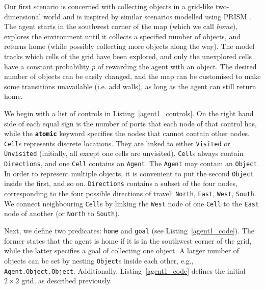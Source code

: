 \documentclass[runningheads]{llncs}
\begin{document}
Our first scenario is concerned with collecting objects in a grid-like
two-dimensional world and is inspired by similar scenarios modelled using PRISM
\cite{dblp:conf/nfm/giaquintahimn18,DBLP:conf/spin/HoffmannIMNV16}. The agent
starts in the southwest corner of the map (which we call \emph{home}), explores
the environment until it collects a specified number of objects, and returns
home (while possibly collecting more objects along the way). The model tracks
which cells of the grid have been explored, and only the unexplored cells have a
constant probability $p$ of rewarding the agent with an object. The desired
number of objects can be easily changed, and the map can be customised to make
some transitions unavailable (i.e. add walls), as long as the agent can still
return home.



We begin with a list of controls in Listing~\ref{agent1_controls}. On the right
hand side of each equal sign is the number of ports that each node of that
control has, while the \texttt{\textbf{atomic}} keyword specifies the nodes that
cannot contain other nodes. \texttt{Cell}s represents discrete locations. They
are linked to either \texttt{Visited} or \texttt{Unvisited} (initially, all
except one cells are unvisited). \texttt{Cell}s always contain
\texttt{Directions}, and one \texttt{Cell} contains an \texttt{Agent}. The
\texttt{Agent} may contain an \texttt{Object}. In order to represent multiple
objects, it is convenient to put the second \texttt{Object} inside the first,
and so on. \texttt{Directions} contains a subset of the four nodes,
corresponding to the four possible directions of travel: \texttt{North},
\texttt{East}, \texttt{West}, \texttt{South}. We connect neighbouring
\texttt{Cell}s by linking the \texttt{West} node of one \texttt{Cell} to the
\texttt{East} node of another (or \texttt{North} to \texttt{South}).



Next, we define two predicates: \texttt{home} and \texttt{goal} (see
Listing~\ref{agent1_code}). The former states that the agent is home if it is in
the southwest corner of the grid, while the latter specifies a goal of
collecting one object. A larger number of objects can be set by nesting
\texttt{Object}s inside each other, e.g., \texttt{Agent.Object.Object}.
Additionally, Listing~\ref{agent1_code} defines the initial $2 \times 2$ grid,
as described previously.
\end{document}
